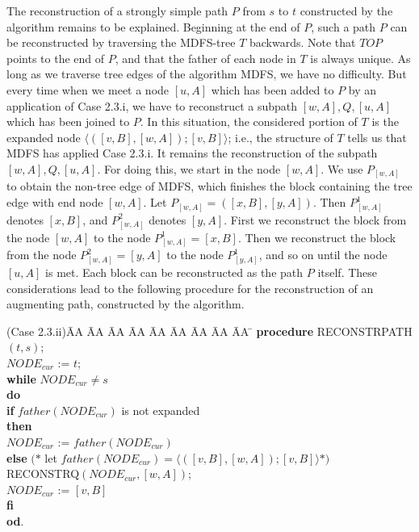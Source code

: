 \documentclass[12pt,twoside,a4paper]{article}
\begin{document}
\noindent
The reconstruction of a strongly simple path $P$ from $s$ to $t$ constructed by
the algorithm remains to be explained. 
Beginning at the end of $P$, such a path $P$ can be reconstructed by traversing
the MDFS-tree $T$ backwards. Note that $TOP$ points to the end of $P$,
and that the father of each node in $T$ is always unique.
As long as we traverse tree edges of the algorithm MDFS, we have no difficulty.
But every time when we meet a node $[u,A]$ which has been added to $P$ by an 
application of Case 2.3.i, we have to reconstruct a subpath $[w,A],Q,[u,A]$ 
which has been joined to $P$. In this situation, the considered portion of $T$
is the expanded node $\langle ([v,B],[w,A]); [v,B]\rangle$;
i.e., the structure of $T$ tells us that MDFS has applied Case 2.3.i.
It remains the reconstruction of the subpath $[w,A],Q,[u,A]$. For doing this, 
we start in the node $[w,A]$. We use $P_{[w,A]}$ to obtain the non-tree edge of MDFS, 
which finishes the block containing the tree edge with end node $[w,A]$.
Let $P_{[w,A]} = ([x,B],[y,A])$. Then $P^1_{[w,A]}$ denotes $[x,B]$, and
$P^2_{[w,A]}$ denotes $[y,A]$. First we reconstruct the block from the node
$[w,A]$ to the node $P^1_{[w,A]} = [x,B]$. Then we reconstruct the block from the node
$P^2_{[w,A]} = [y,A]$ to the node $P^1_{[y,A]}$, and so on until the node
$[u,A]$ is met. Each block can be reconstructed as the path $P$ itself.
These considerations lead to the following procedure for the reconstruction of
an augmenting path, constructed by the algorithm.
\begin{tabbing}
(Case 2.3.ii)\= AA \= AA \= AA \= AA \= AA \= AA \= AA \= AA \= AA \= \kill
\> {\bf procedure} RECONSTRPATH$(t,s)$; \\
\> $NODE_{cur}$ := $t$; \\
\> {\bf while} $NODE_{cur} \not= s$ \\
\> {\bf do} \\ 
\> \> {\bf if} $father(NODE_{cur})$ is not expanded \\
\> \> {\bf then} \\
\> \> \> $NODE_{cur}$ := $father(NODE_{cur})$ \\
\> \> {\bf else} $(\ast$ let $father(NODE_{cur}) = \langle ([v,B],[w,A]); [v,B] 
\rangle \ast)$ \\
\> \> \> RECONSTRQ$(NODE_{cur},[w,A])$; \\
\> \> \> $NODE_{cur}$ := $[v,B]$ \\
\> \> {\bf fi} \\
\> {\bf od}. \\
\end{tabbing}
\end{document}
